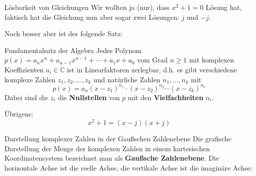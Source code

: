 \begin{frame}{Lösbarkeit von Gleichungen}
	Wir wollten ja (nur), dass $x^{2}+1=0$ Lösung hat, faktisch hat die Gleichung nun aber sogar zwei Lösungen: $j$ und $-j$.
	
	Noch besser aber ist der folgende Satz:
	\begin{block}{Fundamentalsatz der Algebra}
		Jedes Polynom $p(x)=a_{n}x^{n} + a_{n-1} x^{n-1} + \cdots + a_{1}x + a_{0}$ vom Grad $n\geq 1$ mit komplexen Koeffizienten $a_{i} \in \mathbb{C}$ ist in Linearfaktoren zerlegbar, d.h. es gibt verschiedene komplexe Zahlen $z_{1}, z_{2}, \ldots ,z_{k}$ und natürliche Zahlen $n_{1} , \ldots , n_{k}$ mit
		$$
		p(x) = a_{n} (x-z_{1})^{n_{1}} \cdot (x-z_{2})^{n_{2}} \cdots (x-z_{k})^{n_{k}} 
		$$ 	
		Dabei sind die $z_{i}$ die \textbf{Nullstellen} von $p$ mit den \textbf{Vielfachheiten} $n_{i}$.
	\end{block}
	Übrigens: 
	$$
	x^{2} + 1 = (x-j)(x+j)
	$$
\end{frame}
\begin{frame}{Darstellung komplexer Zahlen in der Gaußschen Zahlenebene}
	Die grafische Darstellung der Menge der komplexen Zahlen in einem kartesischen Koordinatensystem bezeichnet man als \textbf{Gaußsche Zahlenebene}. Die horizontale Achse ist die reelle Achse, die vertikale Achse ist die imaginäre Achse:
	
\end{frame}
